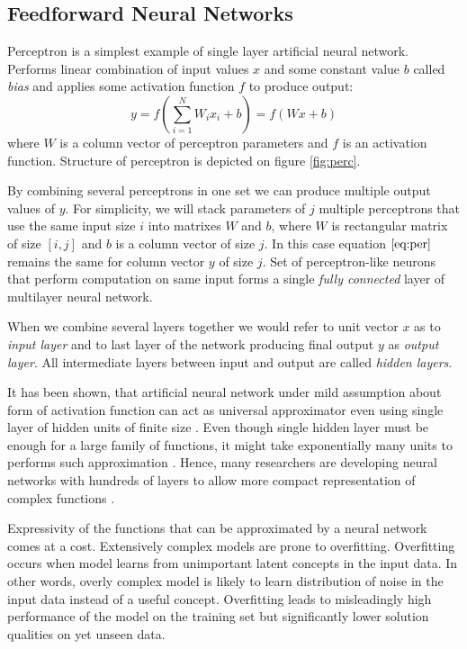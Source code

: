\subsection{Feedforward Neural Networks}
\label{ch:ffnn}

Perceptron is a simplest example of single layer artificial neural network.
Performs linear combination of input values $x$ and some constant value $b$ called \textit{bias} and applies some activation function $f$ to produce output:
\begin{equation}\label{eq:per}
  y = f(\sum_{i=1}^N W_ix_i + b) = f(Wx+b)
\end{equation}
where $W$ is a column vector of perceptron parameters and $f$ is an activation function. Structure of perceptron is depicted on figure \ref{fig:perc}.



By combining several perceptrons in one set we can produce multiple output values of $y$.
For simplicity, we will stack parameters of $j$ multiple perceptrons that use the same input size $i$ into matrixes $W$ and $b$, where $W$ is rectangular matrix of size $[i,j]$ and $b$ is a column vector of size $j$.
In this case equation $\ref{eq:per}$ remains the same for column vector $y$ of size $j$. Set of perceptron-like neurons that perform computation on same input forms a single \textit{fully connected} layer of multilayer neural network.

When we combine several layers together we would refer to unit vector $x$ as to \textit{input layer} and to last layer of the network producing final output $y$ as \textit{output layer}. All intermediate layers between input and output are called \textit{hidden layers}.

It has been shown, that artificial neural network under mild assumption about form of activation function can act as universal approximator even using single layer of hidden units of finite size \cite{Debao1993}.
Even though single hidden layer must be enough for a large family of functions, it might take exponentially many units to performs such approximation \cite{Pascanu2014}.
Hence, many researchers are developing neural networks with hundreds of layers to allow more compact representation of complex functions \cite{He2015, Srivastava2015}.

Expressivity of the functions that can be approximated by a neural network comes at a cost.
Extensively complex models are prone to overfitting. Overfitting occurs when model learns from unimportant latent concepts in the input data.
In other words, overly complex model is likely to learn distribution of noise in the input data instead of a useful concept.
Overfitting leads to misleadingly high performance of the model on the training set but significantly lower solution qualities on yet unseen data.

